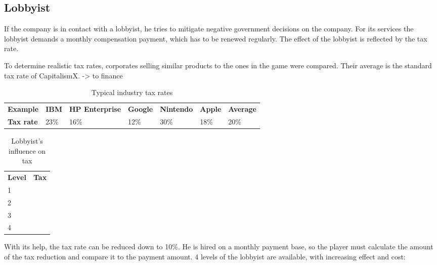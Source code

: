\subsection{Lobbyist}
If the company is in contact with a lobbyist, he tries to mitigate negative government decisions on the company. For its services the lobbyist demands a monthly compensation payment, which has to be renewed regularly. The effect of the lobbyist is reflected by the tax rate. 

To determine realistic tax rates, corporates selling similar products to the ones in the game were compared. Their average is the standard tax rate of CapitalismX. -> to finance

\begin{table}[]
\centering
\begin{tabular}{lllllll}
\hline
\textbf{Example}    & \textbf{IBM} & \textbf{HP Enterprise} & \textbf{Google} & \textbf{Nintendo} & \textbf{Apple} & \textbf{Average} \\
\textbf{Tax rate}   & 23\%         & 16\%                   & 12\%            & 30\%              & 18\%           & 20\%            \\
\hline
\end{tabular}
\caption{Typical industry tax rates}
    \label{Industry_tax}
\end{table}

\begin{table}[]
\centering
\begin{tabular}{ll}
\hline
\textbf{Level} & \textbf{Tax} \\
1              &              \\
2              &              \\
3              &              \\
4              &                \\
\hline
\end{tabular}
\caption{Lobbyist's influence on tax}
    \label{Lobby_tax}
\end{table}
With its help, the tax rate can be reduced down to 10\%. He is hired on a monthly payment base, so the player must calculate the amount of the tax reduction and compare it to the payment amount. 4 levels of the lobbyist are available, with increasing effect and cost:



